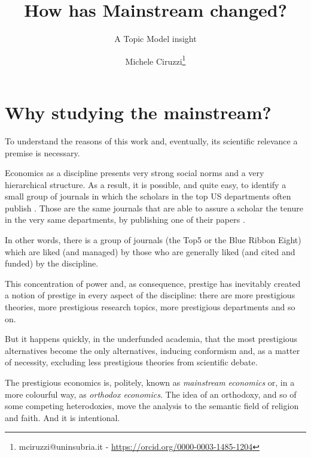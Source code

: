\documentclass[a4paper, 11pt, headings=standardclasses, tablecaptionsbelow]{scrartcl}
\title{How has Mainstream changed? \let\thefootnote\relax\footnotetext{
  This version is intended to be submitted to the XV ESHET Conference
  
  An updated version of this paper and all the source code and the instructions required to replicate the paper are available at \url{https://github.com/TnTo/mainstream/}
}}
\subtitle{A Topic Model insight}
\author{Michele Ciruzzi\thanks{mciruzzi@uninsubria.it - \url{https://orcid.org/0000-0003-1485-1204}}}
\begin{document}
\maketitle


\section{Why studying the mainstream?}
To understand the reasons of this work and, eventually, its scientific relevance a premise is necessary.

Economics as a discipline presents very strong social norms and a very hierarchical structure.
As a result, it is possible, and quite easy, to identify a small group of journals in which the scholars in the top US departments often publish \parencite{card2013,kim2006,kim2009,dusansky1998,hamermesh2013,ellison2003,heck2006}.
Those are the same journals that are able to assure a scholar the tenure in the very same departments, by publishing one of their papers \parencite{heckman2020}.

In other words, there is a group of journals (the Top5 or the Blue Ribbon Eight) which are liked (and managed) by those who are generally liked (and cited and funded) by the discipline.

This concentration of power and, as consequence, prestige has inevitably created a notion of prestige in every aspect of the discipline: there are more prestigious theories, more prestigious research topics, more prestigious departments and so on.

But it happens quickly, in the underfunded academia, that the most prestigious alternatives become the only alternatives, inducing conformism and, as a matter of necessity, excluding less prestigious theories from scientific debate.

The prestigious economics is, politely, known as \textit{mainstream economics} or, in a more colourful way, as \textit{orthodox economics}. The idea of an orthodoxy, and so of some competing heterodoxies, move the analysis to the semantic field of religion and faith. And it is intentional.
\end{document}
